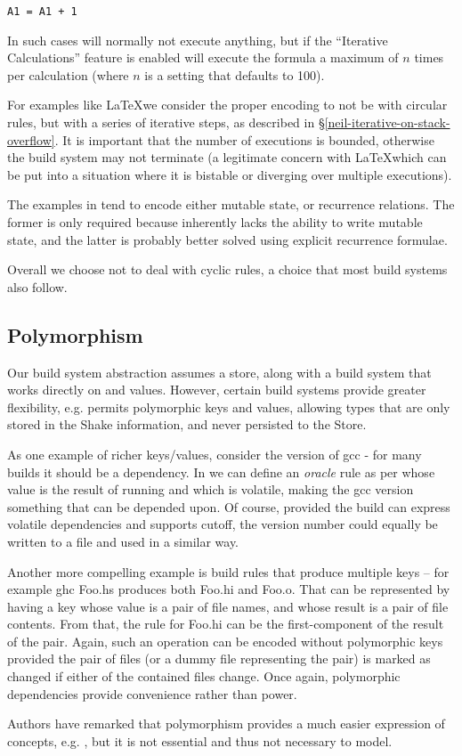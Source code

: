 \begin{verbatim}
A1 = A1 + 1
\end{verbatim}

In such cases \Excel will normally not execute anything, but if the ``Iterative Calculations'' feature is enabled will execute the formula a maximum of $n$ times per calculation (where $n$ is a setting that defaults to 100).

For examples like \LaTeX we consider the proper encoding to not be with circular rules, but with a series of iterative steps, as described in \S\ref{neil-iterative-on-stack-overflow}. It is important that the number of executions is bounded, otherwise the build system may not terminate (a legitimate concern with \LaTeX which can be put into a situation where it is bistable or diverging over multiple executions).

The examples in \Excel tend to encode either mutable state, or recurrence relations. The former is only required because \Excel inherently lacks the ability to write mutable state, and the latter is probably better solved using explicit recurrence formulae.

Overall we choose not to deal with cyclic rules, a choice that most build systems also follow.

\subsection{Polymorphism}\label{sec-polymorphism}

Our build system abstraction assumes a  store, along with a build system that works directly on  and  values. However, certain build systems provide greater flexibility, e.g. \Shake permits polymorphic keys and values, allowing types that are only stored in the Shake information, and never persisted to the Store.

As one example of richer keys/values, consider the version of \textsf{gcc} - for many builds it should be a dependency. In \Shake we can define an \textit{oracle} rule as per \cite{mitchell2012shake} whose value is the result of running  and which is volatile, making the \textsf{gcc} version something that can be depended upon. Of course, provided the build can express volatile dependencies and supports cutoff, the version number could equally be written to a file and used in a similar way.

Another more compelling example is build rules that produce multiple keys -- for example \textsf{ghc Foo.hs} produces both \textsf{Foo.hi} and \textsf{Foo.o}. That can be represented by having a key whose value is a pair of file names, and whose result is a pair of file contents. From that, the rule for \textsf{Foo.hi} can be the first-component of the result of the pair. Again, such an operation can be encoded without polymorphic keys provided the pair of files (or a dummy file representing the pair) is marked as changed if either of the contained files change. Once again, polymorphic dependencies provide convenience rather than power.

Authors have remarked that polymorphism provides a much easier expression of concepts, e.g. \citet{hadrian}, but it is not essential and thus not necessary to model.

